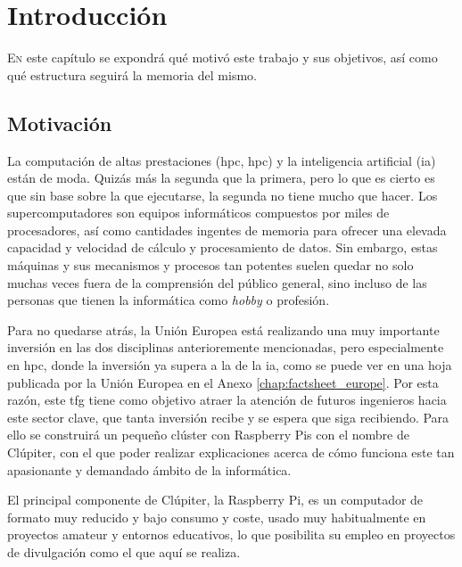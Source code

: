 \chapter{Introducción}
\label{chap:introducion}

\lettrine{E}{n} este capítulo se expondrá qué motivó este trabajo y sus objetivos, así como qué estructura seguirá la memoria del mismo.


\section{Motivación}
\label{sec:motivacion}

La computación de altas prestaciones (\acrshort{hpc}, \acrlong{hpc}) y la inteligencia artificial (\acrshort{ia}) están de moda. Quizás más la segunda que la primera, pero lo que es cierto es que sin base sobre la que ejecutarse, la segunda no tiene mucho que hacer.
Los supercomputadores son equipos informáticos compuestos por miles de procesadores, así como cantidades ingentes de memoria para ofrecer una elevada capacidad y velocidad de cálculo y procesamiento de datos.
Sin embargo, estas máquinas y sus mecanismos y procesos tan potentes suelen quedar no solo muchas veces fuera de la comprensión del público general, sino incluso de las personas que tienen la informática como \textit{hobby} o profesión.

Para no quedarse atrás, la Unión Europea está realizando una muy importante inversión en las dos disciplinas anterioremente mencionadas, pero especialmente en \acrshort{hpc}, donde la inversión ya supera a la de la \acrshort{ia}, como se puede ver en una hoja publicada por la Unión Europea en el Anexo \ref{chap:factsheet_europe}.
Por esta razón, este \acrshort{tfg} tiene como objetivo atraer la atención de futuros ingenieros hacia este sector clave, que tanta inversión recibe y se espera que siga recibiendo. Para ello se construirá un pequeño clúster con Raspberry Pis con el nombre de Clúpiter, con el que poder realizar explicaciones acerca de cómo funciona este tan apasionante y demandado ámbito de la informática.

El principal componente de Clúpiter, la Raspberry Pi, es un computador de formato muy reducido y bajo consumo y coste, usado muy habitualmente en proyectos amateur y entornos educativos, lo que posibilita su empleo en proyectos de divulgación como el que aquí se realiza.

